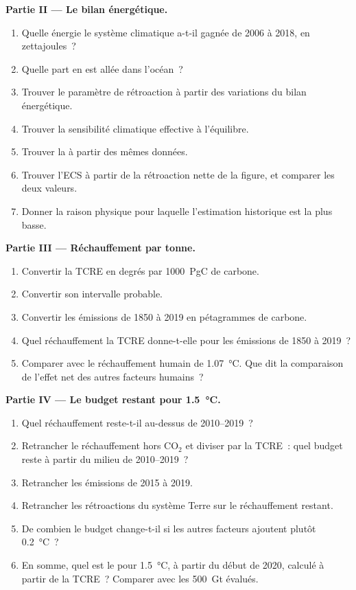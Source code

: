 \begin{problem}
\noindent\textbf{Partie II --- Le bilan énergétique.}
\begin{enumerate}[resume]
  \item Quelle énergie le système climatique a-t-il gagnée de 2006 à 2018, en zettajoules~?
  \item Quelle part en est allée dans l'océan~?
  \item Trouver le paramètre de rétroaction à partir des variations du bilan énergétique.
  \item Trouver la sensibilité climatique effective à l'équilibre.
  \item Trouver la  à partir des mêmes données.
  \item Trouver l'ECS à partir de la rétroaction nette de la figure, et comparer les deux valeurs.
  \item Donner la raison physique pour laquelle l'estimation historique est la plus basse.
\end{enumerate}

\noindent\textbf{Partie III --- Réchauffement par tonne.}
\begin{enumerate}[resume]
  \item Convertir la TCRE en degrés par \qty{1000}{PgC} de carbone.
  \item Convertir son intervalle probable.
  \item Convertir les émissions de 1850 à 2019 en pétagrammes de carbone.
  \item Quel réchauffement la TCRE donne-t-elle pour les émissions de 1850 à 2019~?
  \item Comparer avec le réchauffement humain de \qty{1.07}{\celsius}. Que dit la comparaison de l'effet
        net des autres facteurs humains~?
\end{enumerate}

\noindent\textbf{Partie IV --- Le budget restant pour \qty{1.5}{\celsius}.}
\begin{enumerate}[resume]
  \item Quel réchauffement reste-t-il au-dessus de 2010--2019~?
  \item Retrancher le réchauffement hors CO$_2$ et diviser par la TCRE~: quel budget reste à partir du milieu
        de 2010--2019~?
  \item Retrancher les émissions de 2015 à 2019.
  \item Retrancher les rétroactions du système Terre sur le réchauffement restant.
  \item De combien le budget change-t-il si les autres facteurs ajoutent plutôt \qty{0.2}{\celsius}~?
  \item En somme, quel est le  pour \qty{1.5}{\celsius}, à partir du début de
        2020, calculé à partir de la TCRE~? Comparer avec les \qty{500}{Gt} évalués.
\end{enumerate}
\end{problem}
